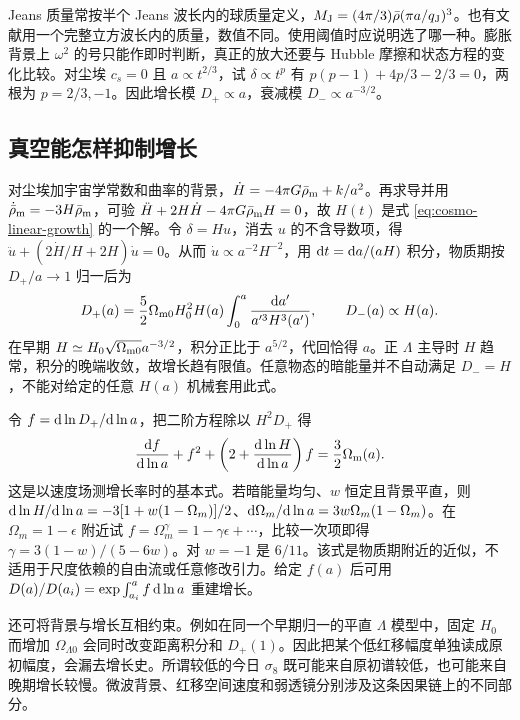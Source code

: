 Jeans 质量常按半个 Jeans 波长内的球质量定义，$M_{\rm J}=(4\pi/3)\bar\rho(\pi a/q_{\rm J})^3$。也有文献用一个完整立方波长内的质量，数值不同。使用阈值时应说明选了哪一种。膨胀背景上 $\omega^2$ 的号只能作即时判断，真正的放大还要与 Hubble 摩擦和状态方程的变化比较。对尘埃 $c_s=0$ 且 $a\propto t^{2/3}$，试 $\delta\propto t^p$ 有 $p(p-1)+4p/3-2/3=0$，两根为 $p=2/3,-1$。因此增长模 $D_+\propto a$，衰减模 $D_-\propto a^{-3/2}$。

\subsection{真空能怎样抑制增长}

对尘埃加宇宙学常数和曲率的背景，$\dot H=-4\pi G\bar\rho_{\rm m}+k/a^2$。再求导并用 $\dot{\bar\rho}_{\rm m}=-3H\bar\rho_{\rm m}$，可验 $\ddot H+2H\dot H-4\pi G\bar\rho_{\rm m}H=0$，故 $H(t)$ 是式 \eqref{eq:cosmo-linear-growth} 的一个解。令 $\delta=H u$，消去 $u$ 的不含导数项，得 $\ddot u+(2\dot H/H+2H)\dot u=0$。从而 $\dot u\propto a^{-2}H^{-2}$，用 $\dd t=\dd a/(aH)$ 积分，物质期按 $D_+/a\to1$ 归一后为
\begin{equation}\label{eq:cosmo-growth-integral}
 D_+(a)=\frac52\Omega_{\rm m0}H_0^2H(a)
              \int_0^a\frac{\dd a'}{a'^3H^3(a')},\qquad D_-(a)\propto H(a).
\end{equation}
在早期 $H\simeq H_0\sqrt{\Omega_{\rm m0}}a^{-3/2}$，积分正比于 $a^{5/2}$，代回恰得 $a$。正 $\Lambda$ 主导时 $H$ 趋常，积分的晚端收敛，故增长趋有限值。任意物态的暗能量并不自动满足 $D_-=H$，不能对给定的任意 $H(a)$ 机械套用此式。

令 $f=\dd\ln D_+/\dd\ln a$，把二阶方程除以 $H^2D_+$ 得
\[
 \frac{\dd f}{\dd\ln a}+f^2+
 \left(2+\frac{\dd\ln H}{\dd\ln a}\right)f=\frac32\Omega_{\rm m}(a).
\]
这是以速度场测增长率时的基本式。若暗能量均匀、$w$ 恒定且背景平直，则 $\dd\ln H/\dd\ln a=-3[1+w(1-\Omega_m)]/2$、$\dd\Omega_m/\dd\ln a=3w\Omega_m(1-\Omega_m)$。在 $\Omega_m=1-\epsilon$ 附近试 $f=\Omega_m^\gamma=1-\gamma\epsilon+\cdots$，比较一次项即得 $\gamma=3(1-w)/(5-6w)$。对 $w=-1$ 是 $6/11$。该式是物质期附近的近似，不适用于尺度依赖的自由流或任意修改引力。给定 $f(a)$ 后可用 $D(a)/D(a_i)=\exp\int_{a_i}^a f\,\dd\ln a$ 重建增长。

还可将背景与增长互相约束。例如在同一个早期归一的平直 $\Lambda$ 模型中，固定 $H_0$ 而增加 $\Omega_{\Lambda0}$ 会同时改变距离积分和 $D_+(1)$。因此把某个低红移幅度单独读成原初幅度，会漏去增长史。所谓较低的今日 $\sigma_8$ 既可能来自原初谱较低，也可能来自晚期增长较慢。微波背景、红移空间速度和弱透镜分别涉及这条因果链上的不同部分。


